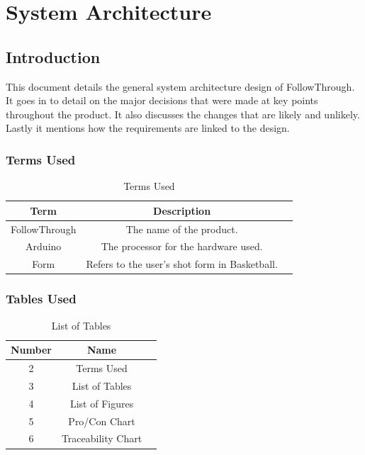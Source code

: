 \chapter{System Architecture}

\section{Introduction}
This document details the general system architecture design of FollowThrough. It goes in to detail on the major decisions that were made at key points throughout the product. It also discusses the changes that are likely and unlikely. Lastly it mentions how the requirements are linked to the design.

\subsection{Terms Used}
\begin{table}[h!]
  \centering
  \caption{Terms Used}
  \label{tab:table2}
  \begin{tabular}{ccc}
    \toprule
    Term & Description\\
    \midrule
    FollowThrough & The name of the product.\\
    Arduino & The processor for the hardware used.\\
    Form & Refers to the user's shot form in Basketball.\\
    \bottomrule
  \end{tabular}
\end{table}

\subsection{Tables Used}
\begin{table}[h!]
  \centering
  \caption{List of Tables}
  \label{tab:table3}
  \begin{tabular}{ccc}
    \toprule
    Number & Name\\
    \midrule
    2 & Terms Used\\
    3 & List of Tables\\
    4 & List of Figures\\
    5 & Pro/Con Chart\\
    6 & Traceability Chart\\
    \bottomrule
  \end{tabular}
\end{table}

